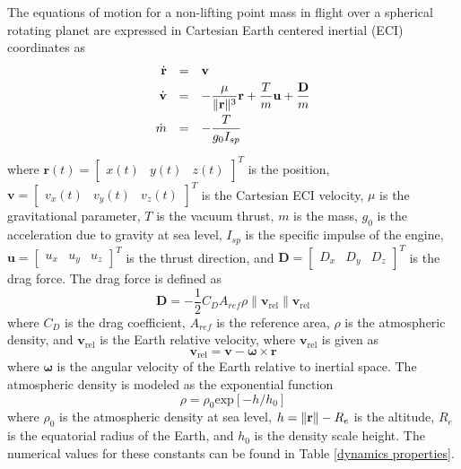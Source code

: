 \documentclass[10pt]{article}
\begin{document}
The equations of motion for a non-lifting point mass in flight over a
spherical rotating planet are expressed in Cartesian Earth centered inertial
(ECI) coordinates as
\begin{equation}\label{dyncs}
\begin{array}{rcl}
  \dot{\textbf{r}} &=& \mathbf{v} \vspace{3pt}\\
  \dot{\textbf{v}} &=& -\displaystyle\frac{\mu}{\|\textbf{r}\|^3}\mathbf{r} +
  \displaystyle\frac{T}{m}\mathbf{u} + \displaystyle\frac{\mathbf{D}}{m}  \vspace{3pt}\\
  \dot{m} & = & -\displaystyle\frac{T}{g_0I_{sp}}
\vspace{3pt}\\
\end{array}
\end{equation}
where $\mathbf{r}(t)=\left[\begin{array}{ccc} x(t) & y(t) & z(t)\end{array}\right]^T$
is the position, $\mathbf{v} = \left[\begin{array}{ccc} v_x(t) & v_y(t) & v_z(t)\end{array}\right]^T$
is the Cartesian ECI velocity, $\mu$ is the gravitational parameter, $T$ is
the vacuum thrust, $m$ is the mass, $g_0$ is the acceleration due to gravity at sea level,
$I_{sp}$ is the specific impulse of the engine,
$\mathbf{u} = \left[\begin{array}{ccc} u_x & u_y & u_z \end{array}\right]^T$ is the thrust
direction, and $\mathbf{D}=\left[\begin{array}{ccc} D_x & D_y & D_z \end{array}\right]^T$
is the drag force.  The drag force is defined as
\begin{equation}
  \mathbf{D} = -\frac{1}{2}C_D A_{ref}\rho \|\mathbf{v}_{\textrm{rel}}\|\mathbf{v}_{\textrm{rel}}
\end{equation}
where $C_D$ is the drag coefficient, $A_{ref}$ is the reference area, $\rho$
is the atmospheric density, and $\mathbf{v}_{\textrm{rel}}$ is the Earth relative
velocity, where $\mathbf{v}_{\textrm{rel}}$ is given as
\begin{equation}
\mathbf{v}_{\textrm{rel}} = \mathbf{v}-\boldsymbol{\omega} \times \mathbf{r}
\end{equation}
where $\boldsymbol\omega$ is the angular velocity of the Earth relative to
inertial space.  The atmospheric density is modeled as the exponential
function
\begin{equation}
\rho = \rho_0\mbox{exp}[-h/h_0]
\end{equation}
where $\rho_0$ is the atmospheric density at sea level, $h=\|\mathbf{r}\|-R_e$ is
the altitude, $R_e$ is the equatorial radius of the Earth, and $h_0$ is the
density scale height.  The numerical values for these constants can be found
in Table \ref{dynamics properties}.
\end{document}
